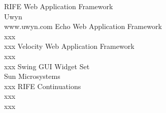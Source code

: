 \documentclass[10pt,aps, prb,preprint]{article}
\begin{document}
\begin{thebibliography}{5}
 RIFE Web Application Framework\\ Uwyn\\ www.uwyn.com
 Echo Web Application Framework\\ xxx\\ xxx
 Velocity Web Application Framework\\ xxx\\ xxx
 Swing GUI Widget Set\\ Sun Microsystems\\ xxx
 RIFE Continuations\\ xxx\\ xxx
\end{thebibliography}
\end{document}
